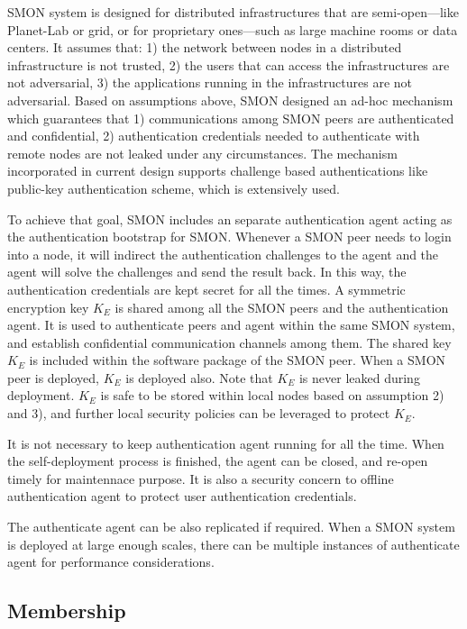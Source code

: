 SMON system is designed for distributed infrastructures that are
semi-open---like Planet-Lab or grid, or for proprietary
ones---such as large machine rooms or data centers. It assumes
that: 1) the network between nodes in a distributed
infrastructure is not trusted, 2) the users that can access the
infrastructures are not adversarial, 3) the applications running
in the infrastructures are not adversarial. Based on assumptions
above, SMON designed an ad-hoc mechanism which guarantees that 1)
communications among SMON peers are authenticated and
confidential, 2) authentication credentials needed to
authenticate with remote nodes are not leaked under any
circumstances. The mechanism incorporated in current design
supports challenge
based authentications like public-key authentication scheme,
which is extensively used.

To achieve that goal, SMON includes an separate authentication
agent acting as the authentication bootstrap for SMON.
Whenever a SMON peer needs to login into a node, it will indirect
the authentication challenges to the agent and the agent will
solve the challenges and send the result back. In this way, the
authentication credentials are kept secret for all the times. A
symmetric encryption key $K_E$ is shared among all the SMON peers
and the authentication agent. It is used to authenticate peers
and agent within the same SMON system, and establish confidential
communication channels among them. The shared key $K_E$ is
included within the software package of the SMON peer. When a SMON
peer is deployed, $K_E$ is deployed also. Note that $K_E$ is
never leaked during deployment. $K_E$ is safe to be stored
within local nodes based on assumption 2) and 3), and further
local security policies can be leveraged to protect $K_E$.

It is not necessary to keep authentication agent running for all
the time.  When the self-deployment process is finished, the
agent can be closed, and re-open timely for maintennace purpose.
It is also a security concern to offline authentication
agent to protect user authentication credentials.

The authenticate agent can be also replicated if required. When
a SMON system is deployed at large enough scales, there can be
multiple instances of authenticate agent for performance
considerations.

\subsection{Membership}

